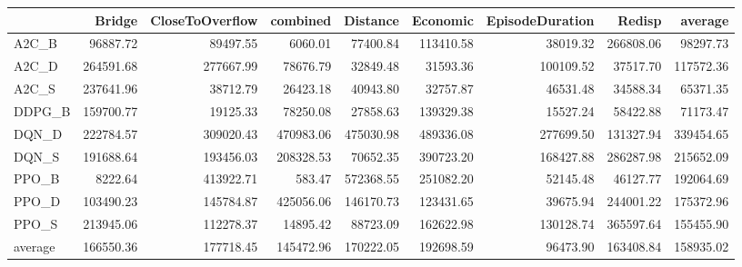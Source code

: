 \begin{tabular}{lrrrrrrrr}
\toprule
{} &     Bridge &  CloseToOverflow &   combined &   Distance &   Economic &  EpisodeDuration &     Redisp &    average \\
\midrule
A2C\_B   &   96887.72 &         89497.55 &    6060.01 &   77400.84 &  113410.58 &         38019.32 &  266808.06 &   98297.73 \\
A2C\_D   &  264591.68 &        277667.99 &   78676.79 &   32849.48 &   31593.36 &        100109.52 &   37517.70 &  117572.36 \\
A2C\_S   &  237641.96 &         38712.79 &   26423.18 &   40943.80 &   32757.87 &         46531.48 &   34588.34 &   65371.35 \\
DDPG\_B  &  159700.77 &         19125.33 &   78250.08 &   27858.63 &  139329.38 &         15527.24 &   58422.88 &   71173.47 \\
DQN\_D   &  222784.57 &        309020.43 &  470983.06 &  475030.98 &  489336.08 &        277699.50 &  131327.94 &  339454.65 \\
DQN\_S   &  191688.64 &        193456.03 &  208328.53 &   70652.35 &  390723.20 &        168427.88 &  286287.98 &  215652.09 \\
PPO\_B   &    8222.64 &        413922.71 &     583.47 &  572368.55 &  251082.20 &         52145.48 &   46127.77 &  192064.69 \\
PPO\_D   &  103490.23 &        145784.87 &  425056.06 &  146170.73 &  123431.65 &         39675.94 &  244001.22 &  175372.96 \\
PPO\_S   &  213945.06 &        112278.37 &   14895.42 &   88723.09 &  162622.98 &        130128.74 &  365597.64 &  155455.90 \\
average &  166550.36 &        177718.45 &  145472.96 &  170222.05 &  192698.59 &         96473.90 &  163408.84 &  158935.02 \\
\bottomrule
\end{tabular}
